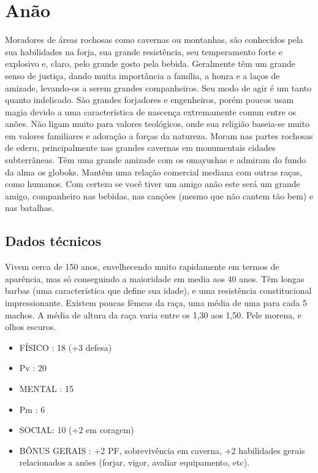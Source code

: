 \section{Anão}

Moradores de áreas rochosas como cavernas ou montanhas, são conhecidos pela sua habilidades na forja, sua grande resistência, seu temperamento forte e explosivo e, claro, pelo grande gosto pela bebida. Geralmente têm um grande senso de justiça, dando muita importância a família, a honra e a laços de amizade, levando-os a serem grandes companheiros. Seu modo de agir é um tanto quanto indelicado. São grandes forjadores e engenheiros, porém poucos usam magia devido a uma característica de nascença extremamente comun entre os anões. Não ligam muito para valores teológicos, onde sua religião baseia-se muito em valores familiares e adoração a forças da natureza. Moram nas partes rochosas de ederu, principalmente nas grandes cavernas em monumentais cidades subterrâneas. Têm uma grande amizade com os omayushas e admiram do fundo da alma os globoks. Mantêm uma relação comercial mediana com outras raças, como humanos. Com certeza se você tiver um amigo anão este será um grande amigo, companheiro nas bebidas, nas canções (mesmo que não cantem tão bem) e nas batalhas.

\subsection{Dados técnicos}

Vivem cerca de 150 anos, envelhecendo muito rapidamente em termos de aparência, mas só conseguindo a maioridade em media aos 40 anos. Têm longas barbas (uma característica que define sua idade), e uma resistência constitucional impressionante. Existem poucas fêmeas da raça, uma média de uma para cada 5 machos. A média de altura da raça varia entre os 1,30 aos 1,50. Pele morena, e olhos escuros. 


\begin{itemize}
	\item FÍSICO : 18 (+3 defesa)
	\item Pv : 20 

	\item MENTAL : 15
	\item Pm : 6

	\item SOCIAL: 10 (+2 em coragem)

	\item BÔNUS GERAIS : +2 PF, sobrevivência em caverna, +2 habilidades gerais relacionados a anões (forjar, vigor, avaliar equipamento, etc).
\end{itemize}

